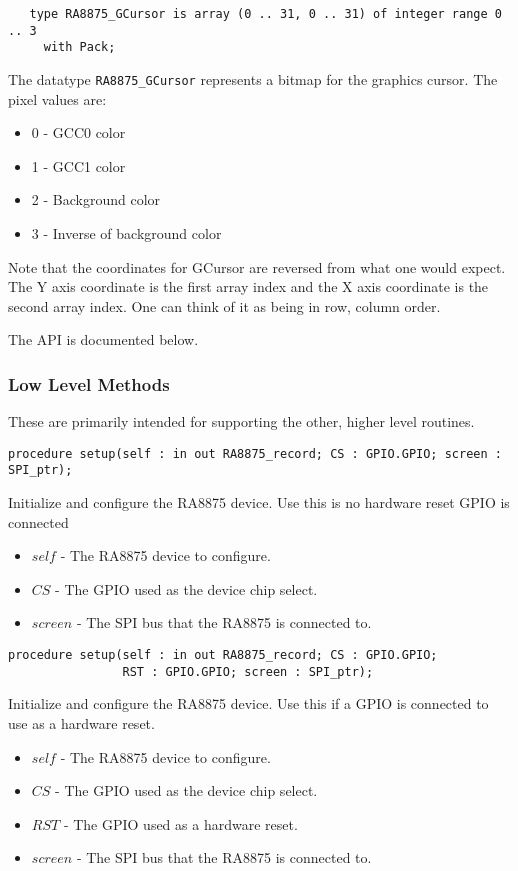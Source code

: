 \documentclass[10pt, openany]{book}
\newcommand{\indextype}[1]{\index[type]{#1}}
\newcommand{\indexfunc}[1]{\index[func]{#1}}
\newcommand{\datatype}[1]{\texttt{#1}}
\begin{document}
\begin{lstlisting}
   type RA8875_GCursor is array (0 .. 31, 0 .. 31) of integer range 0 .. 3
     with Pack;
\end{lstlisting}
\indextype{RA8875\_GCursor}
The datatype \datatype{RA8875\_GCursor} represents a bitmap for the graphics cursor.  The pixel values are:
\begin{itemize}
  \item 0 - GCC0 color
  \item 1 - GCC1 color
  \item 2 - Background color
  \item 3 - Inverse of background color
\end{itemize}
Note that the coordinates for GCursor are reversed from what one would expect.  The Y axis coordinate is the first array index and the X axis coordinate is the second array index.  One can think of it as being in row, column order.

The API is documented below.

\subsubsection{Low Level Methods}
These are primarily intended for supporting the other, higher level routines.
\begin{lstlisting}
procedure setup(self : in out RA8875_record; CS : GPIO.GPIO; screen : SPI_ptr);
\end{lstlisting}
\indexfunc{setup}
Initialize and configure the RA8875 device.  Use this is no hardware reset GPIO is connected
\begin{itemize}
  \item $self$ - The RA8875 device to configure.
  \item $CS$ - The GPIO used as the device chip select.
  \item $screen$ - The SPI bus that the RA8875 is connected to.
\end{itemize}

\begin{lstlisting}
procedure setup(self : in out RA8875_record; CS : GPIO.GPIO;
                RST : GPIO.GPIO; screen : SPI_ptr);
\end{lstlisting}
\indexfunc{setup}
Initialize and configure the RA8875 device.  Use this if a GPIO is connected to use as a hardware reset.
\begin{itemize}
  \item $self$ - The RA8875 device to configure.
  \item $CS$ - The GPIO used as the device chip select.
  \item $RST$ - The GPIO used as a hardware reset.
  \item $screen$ - The SPI bus that the RA8875 is connected to.
\end{itemize}
\end{document}
